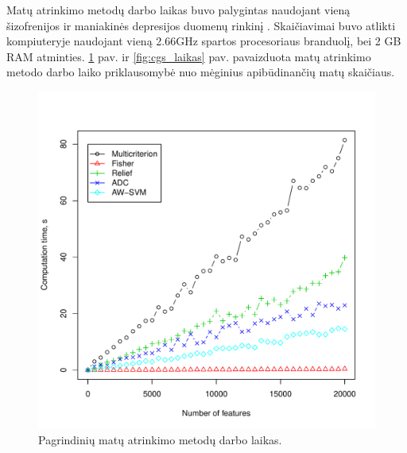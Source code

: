 Matų atrinkimo metodų darbo laikas buvo palygintas naudojant vieną šizofrenijos ir maniakinės depresijos duomenų rinkinį \cite{altara}. Skaičiavimai buvo atlikti kompiuteryje naudojant vieną 2.66GHz spartos procesoriaus branduolį, bei 2 GB RAM atminties. \ref{fig:visu_laikas} pav. ir \ref{fig:cgs_laikas} pav. pavaizduota matų atrinkimo metodo darbo laiko priklausomybė nuo mėginius apibūdinančių matų skaičiaus. 
\begin{figure}[ht]
\begin{minipage}[b]{0.5\linewidth}
\centering
\includegraphics[width=1\textwidth]{images/all_performance.pdf}
 \caption{Pagrindinių matų atrinkimo metodų darbo laikas.}
 \label{fig:visu_laikas}
\end{minipage}
\hspace{0.2cm}
\begin{minipage}[b]{0.5\linewidth}
\centering

\end{minipage}
\end{figure}
